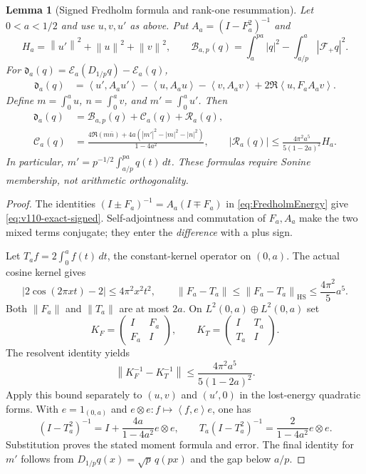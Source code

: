 \documentclass[11pt]{article}
\newtheorem{lemma}[theorem]{Lemma}
\theoremstyle{remark}
\newcommand{\norm}[1]{\left\lVert #1\right\rVert}
\newcommand{\ip}[2]{\left\langle #1,#2\right\rangle}
\begin{document}
\begin{lemma}[Signed Fredholm formula and rank-one resummation]\label{lem:v110-signed}
Let $0<a<1/2$ and use $u,v,u'$ as above. Put
$A_a=(I-F_a^2)^{-1}$ and
\[
 H_a=\norm{u'}^2+\norm u^2+\norm v^2,\qquad
 \mathcal B_{a,p}(q)=\int_a^{pa}|q|^2-\int_{a/p}^a|\mathcal F_+q|^2.
\]
For $\mathfrak d_a(q)=\mathcal E_a(D_{1/p}q)-\mathcal E_a(q)$,
\begin{align}
 \mathfrak d_a(q)
 &=\ip{u'}{A_au'}-\ip{u}{A_au}-\ip{v}{A_av}
       +2\Re\ip{u}{F_aA_av}.\label{eq:v110-exact-signed}
\end{align}
Define $m=\int_0^a u$, $n=\int_0^a v$, and $m'=\int_0^a u'$.
Then
\begin{align}
 \mathfrak d_a(q)&=\mathcal B_{a,p}(q)+\mathcal C_a(q)
                      +\mathcal R_a(q),\label{eq:v110-rankone}\\
 \mathcal C_a(q)&=
 \frac{4\Re(m\overline n)+4a(|m'|^2-|m|^2-|n|^2)}{1-4a^2},
 \qquad
 |\mathcal R_a(q)|\le
 \frac{4\pi^2a^5}{5(1-2a)^2}H_a.\label{eq:v110-rankone-error}
\end{align}
In particular, $m'=p^{-1/2}\int_{a/p}^{pa}q(t)\,dt$.
These formulas require Sonine membership, not arithmetic orthogonality.
\end{lemma}
\begin{proof}
The identities $(I\pm F_a)^{-1}=A_a(I\mp F_a)$ in
\eqref{eq:FredholmEnergy} give \eqref{eq:v110-exact-signed}.
Self-adjointness and commutation of $F_a,A_a$ make the two mixed
terms conjugate; they enter the \emph{difference} with a plus sign.

Let $T_af=2\int_0^a f(t)\,dt$, the constant-kernel operator on $(0,a)$.
The actual cosine kernel gives
\[
 |2\cos(2\pi xt)-2|\le4\pi^2x^2t^2,\qquad
 \norm{F_a-T_a}\le\norm{F_a-T_a}_{\mathrm{HS}}
 \le\frac{4\pi^2}{5}a^5.
\]
Both $\norm{F_a}$ and $\norm{T_a}$ are at most $2a$.
On $L^2(0,a)\oplus L^2(0,a)$ set
\[
 K_F=\begin{pmatrix}I&F_a\\F_a&I\end{pmatrix},\qquad
 K_T=\begin{pmatrix}I&T_a\\T_a&I\end{pmatrix}.
\]
The resolvent identity yields
\[
 \norm{K_F^{-1}-K_T^{-1}}
 \le\frac{4\pi^2a^5}{5(1-2a)^2}.
\]
Apply this bound separately to $(u,v)$ and $(u',0)$ in the lost-energy
quadratic forms. With $e=1_{(0,a)}$ and
$e\otimes e:f\mapsto\ip{f}{e}e$, one has
\[
 (I-T_a^2)^{-1}=I+\frac{4a}{1-4a^2}e\otimes e,
 \qquad T_a(I-T_a^2)^{-1}=\frac{2}{1-4a^2}e\otimes e.
\]
Substitution proves the stated moment formula and error. The final
identity for $m'$ follows from $D_{1/p}q(x)=\sqrt p\,q(px)$ and
the gap below $a/p$.
\end{proof}
\end{document}
